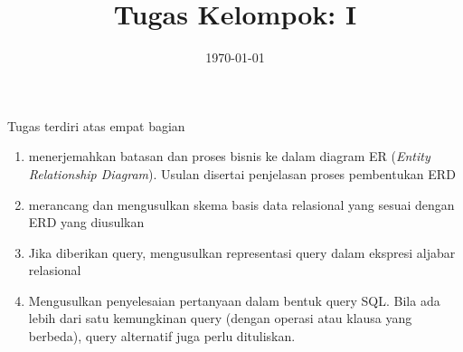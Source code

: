 \documentclass[a4paper,11pt]{article}
\date{\today}
\title{Tugas Kelompok: I}
\begin{document}
    \header{}
 \selectfont
\begin{deliverablebox}{Tugas terdiri atas empat bagian}
  \begin{enumerate}
    \itemsep0em
    \item menerjemahkan batasan dan proses bisnis ke dalam diagram ER (\textit{Entity Relationship Diagram}). Usulan disertai penjelasan proses pembentukan ERD
     \item merancang dan mengusulkan skema basis data relasional yang sesuai dengan ERD yang diusulkan
     \item Jika diberikan query, mengusulkan  representasi query dalam  ekspresi aljabar relasional
     \item Mengusulkan penyelesaian pertanyaan dalam bentuk query SQL. Bila ada lebih dari satu kemungkinan query (dengan operasi atau klausa yang berbeda), query alternatif juga perlu dituliskan.
\end{enumerate}  
\end{deliverablebox}
\end{document}

